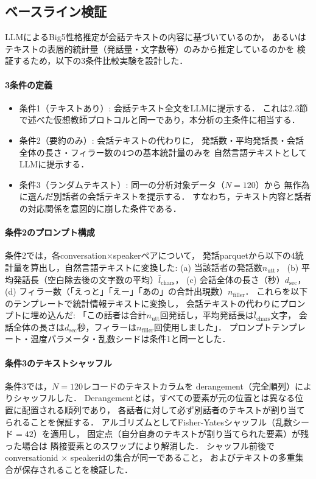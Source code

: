 \documentclass[dvipdfmx,11pt,a4paper]{bxjsarticle}
\renewcommand{\_}{\paperorigunderscore\allowbreak}%
\begin{document}
\subsection{ベースライン検証}
\label{sec:baseline_validation}

LLMによるBig5性格推定が会話テキストの内容に基づいているのか，
あるいはテキストの表層的統計量（発話量・文字数等）のみから推定しているのかを
検証するため，以下の3条件比較実験を設計した．

\paragraph{3条件の定義}
\begin{itemize}
  \item 条件1（テキストあり）: 会話テキスト全文をLLMに提示する．
    これは2.3節で述べた仮想教師プロトコルと同一であり，本分析の主条件に相当する．
  \item 条件2（要約のみ）: 会話テキストの代わりに，
    発話数・平均発話長・会話全体の長さ・フィラー数の4つの基本統計量のみを
    自然言語テキストとしてLLMに提示する．
  \item 条件3（ランダムテキスト）: 同一の分析対象データ（$N = 120$）から
    無作為に選んだ別話者の会話テキストを提示する．
    すなわち，テキスト内容と話者の対応関係を意図的に崩した条件である．
\end{itemize}

\paragraph{条件2のプロンプト構成}
条件2では，各conversation$\times$speakerペアについて，
発話parquetから以下の4統計量を算出し，自然言語テキストに変換した:
(a) 当該話者の発話数$n_{\text{utt}}$，
(b) 平均発話長（空白除去後の文字数の平均）$\bar{l}_{\text{chars}}$，
(c) 会話全体の長さ（秒）$d_{\text{sec}}$，
(d) フィラー数（「えっと」「えー」「あの」の合計出現数）$n_{\text{filler}}$．
これらを以下のテンプレートで統計情報テキストに変換し，
会話テキストの代わりにプロンプトに埋め込んだ:
「この話者は合計$n_{\text{utt}}$回発話し，平均発話長は$\bar{l}_{\text{chars}}$文字，
会話全体の長さは$d_{\text{sec}}$秒，フィラーは$n_{\text{filler}}$回使用しました」．
プロンプトテンプレート・温度パラメータ・乱数シードは条件1と同一とした．

\paragraph{条件3のテキストシャッフル}
条件3では，$N = 120$レコードのテキストカラムを
derangement（完全順列）によりシャッフルした．
Derangementとは，すべての要素が元の位置とは異なる位置に配置される順列であり，
各話者に対して必ず別話者のテキストが割り当てられることを保証する．
アルゴリズムとしてFisher-Yatesシャッフル（乱数シード$= 42$）を適用し，
固定点（自分自身のテキストが割り当てられた要素）が残った場合は
隣接要素とのスワップにより解消した．
シャッフル前後でconversation\_id $\times$ speaker\_idの集合が同一であること，
およびテキストの多重集合が保存されることを検証した．
\end{document}
